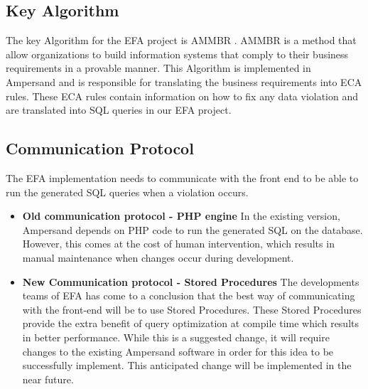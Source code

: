 \documentclass[12pt, svgnames]{article}
\let\Oldsubsection\subsection
\renewcommand{\subsection}{\FloatBarrier\Oldsubsection}
\begin{document}
\subsection{Key Algorithm}
The key Algorithm for the EFA project is AMMBR \cite{AMMBR}. AMMBR is a method 
that allow organizations to build information systems that comply to their 
business requirements in a provable manner. This Algorithm is implemented in 
Ampersand and is responsible for translating the business requirements into ECA 
rules. These ECA rules contain information on how to fix any data violation and 
are translated into SQL queries in our EFA project.

\subsection{Communication Protocol}
The EFA implementation needs to communicate with the front end to be able to 
run the generated SQL queries when a violation occurs. 
	\begin{itemize}
		\item \textbf{Old communication protocol -  PHP engine} \newline
			In the existing version, Ampersand depends on PHP code to run the 
			generated SQL on the database. However, this comes at the cost of 
			human intervention, which results in manual maintenance when 
			changes occur during development. 
		\item \textbf{New Communication protocol - Stored Procedures} \newline
			The developments teams of EFA has come to a conclusion that the 
			best way of communicating with the front-end will be to use Stored 
			Procedures\cite{SP}. These Stored Procedures provide the extra 
			benefit of query optimization at compile time which results in 
			better performance. While this is a suggested change, it will 
			require changes to the existing Ampersand software in order for 
			this idea to be successfully implement. This anticipated 
			change will be implemented in the near future.
			
	\end{itemize}
\end{document}
